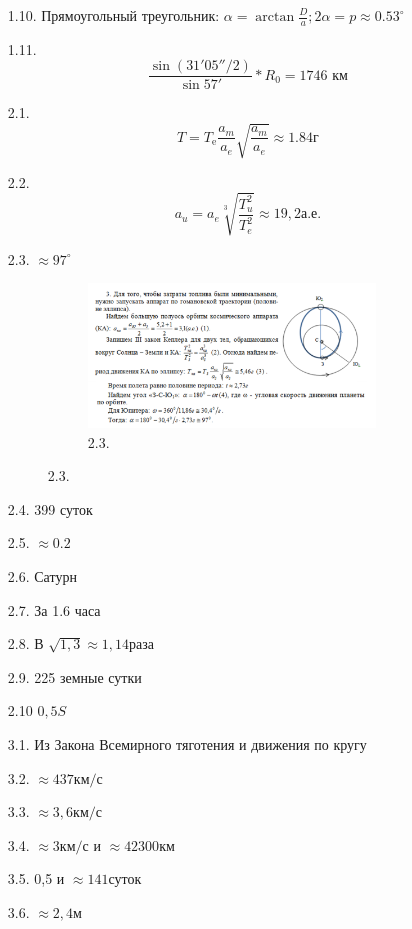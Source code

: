 \documentclass[16pt,a4paper]{report}
\begin{document}
\begin{enumerate}
    \item [1.10.] Прямоугольный треугольник: $\alpha = \arctan{\frac{D}{a}}; 2\alpha = p \approx 0.53^{\circ}$
    \item [1.11.] $$\frac{\sin{(31'05'' / 2)}}{\sin{57'}}*R_0 = 1746 \textrm{ км}$$
    \newpage
    \item [2.1.] $$T=T_{\textrm{e}}\frac{a_m}{a_e}\sqrt{\frac{a_m}{a_e}} \approx 1.84 \textrm{г}$$
    \item [2.2.] $$a_u = a_e \sqrt[3]{\frac{T_u^2}{T_e^2}} \approx 19,2 \textrm{а.е.}$$
    \item [2.3.] $\approx 97^{\circ}$ \begin{figure}[H]
    \centering
    \begin{subfigure}{0.8\textwidth}
        \centering
        \includegraphics[width=0.9\textwidth]{2.3.PNG}
        \caption{2.3.}
        \label{fig:first}
    \end{subfigure}    
    \qquad
\end{figure}
    \item [2.4.] 399 суток
    \item [2.5.] $\approx 0.2$
    \item [2.6.] Сатурн
    \item [2.7.] За 1.6 часа
    \item [2.8.] В $\sqrt{1,3} \approx 1,14 \textrm{раза}$
    \item [2.9.] 225 земные сутки
    \item [2.10] $0,5S$ 
    \item [3.1.] Из Закона Всемирного тяготения и движения по кругу
    \item [3.2.] $\approx 437 \textrm{км/с}$ 
    \item [3.3.] $\approx 3,6 \textrm{км/с}$
    \item [3.4.] $\approx 3 \textrm{км/с}$ и $\approx 42300 \textrm{км}$
    \item [3.5.] 0,5 и $\approx 141 \textrm{суток}$
    \item [3.6.] $\approx 2,4 \textrm{м}$
\end{enumerate}
\end{document}
